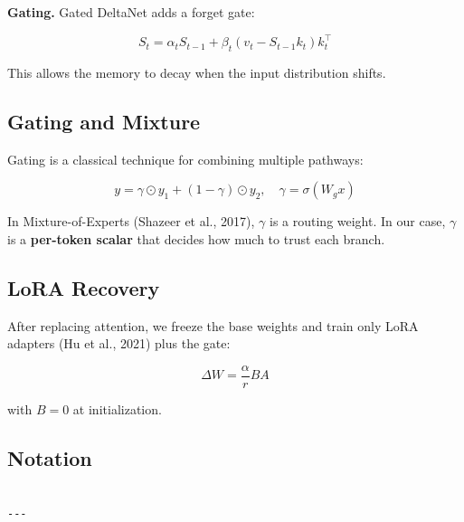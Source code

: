 \textbf{Gating.} Gated DeltaNet adds a forget gate:

\[
S_t = \alpha_t S_{t-1} + \beta_t (v_t - S_{t-1} k_t) k_t^\top
\tag{3.4}
\]

This allows the memory to decay when the input distribution shifts.

\subsection{Gating and Mixture}

Gating is a classical technique for combining multiple pathways:

\[
y = \gamma \odot y_1 + (1 - \gamma) \odot y_2, \quad
\gamma = \sigma(W_g x)
\tag{3.5}
\]

In Mixture-of-Experts (Shazeer et al., 2017), $\gamma$ is a routing weight. 
In our case, $\gamma$ is a \textbf{per-token scalar} that decides how much to 
trust each branch.

\subsection{LoRA Recovery}

After replacing attention, we freeze the base weights and train only LoRA 
adapters (Hu et al., 2021) plus the gate:

\[
\Delta W = \frac{\alpha}{r} B A
\tag{3.6}
\]

with $B = 0$ at initialization.

\subsection{Notation}

\begin{lstlisting}

---
\end{lstlisting}